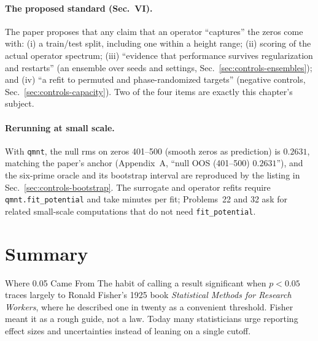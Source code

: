\paragraph{The proposed standard (Sec.~VI).} The paper proposes that any claim that an operator ``captures'' the zeros come with: (i) a train/test split, including one within a height range; (ii) scoring of the actual operator spectrum; (iii) ``evidence that performance survives regularization and restarts'' (an ensemble over seeds and settings, Sec.~\ref{sec:controls-ensembles}); and (iv) ``a refit to permuted and phase-randomized targets'' (negative controls, Sec.~\ref{sec:controls-capacity}). Two of the four items are exactly this chapter's subject.

\paragraph{Rerunning at small scale.} With \texttt{qmnt}, the null rms on zeros 401--500 (smooth zeros as prediction) is $0.2631$, matching the paper's anchor (Appendix~A, ``null OOS (401--500) $0.2631$''), and the six-prime oracle and its bootstrap interval are reproduced by the listing in Sec.~\ref{sec:controls-bootstrap}. The surrogate and operator refits require \texttt{qmnt.fit\_potential} and take minutes per fit; Problems~22 and 32 ask for related small-scale computations that do not need \texttt{fit\_potential}.

\section{Summary}
\begin{didyouknow}{Where 0.05 Came From}
The habit of calling a result significant when $p<0.05$ traces largely to Ronald Fisher's 1925 book \emph{Statistical Methods for Research Workers}, where he described one in twenty as a convenient threshold. Fisher meant it as a rough guide, not a law. Today many statisticians urge reporting effect sizes and uncertainties instead of leaning on a single cutoff.
\end{didyouknow}

